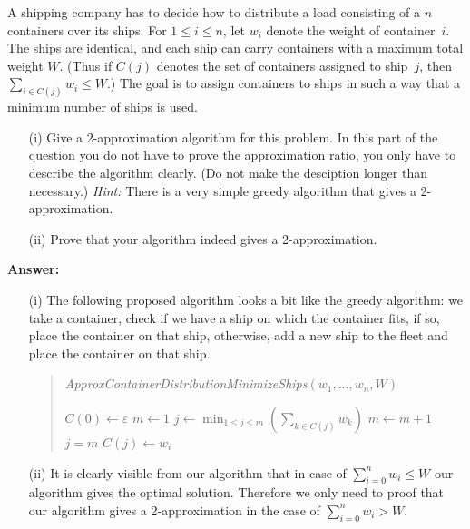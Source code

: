 \documentclass{article}
\newcommand{\eps}{\varepsilon}
\renewcommand{\leq}{\leqslant}
\renewcommand{\geq}{\geqslant}
\newcounter{rcounter}
\newenvironment{rlist}%
{\begin{list}{\setnr-\arabic{rcounter}}{\usecounter{rcounter}}}{\end{list}}
\begin{document}
\begin{rlist}
        A shipping company has to decide how to distribute a load consisting of a $n$ containers over its ships. For $1\leq i\leq n$, let $w_i$ denote the weight of container~$i$. The ships are identical, and each ship can carry containers with a maximum total weight $W$. (Thus if $C(j)$ denotes the set of containers assigned to ship~$j$, then $\sum_{i\in C(j)} w_i \leq W$.) The goal is to assign containers to ships in such a way that a minimum number of ships is used.
        \begin{enumerate}
            \item[(i)]
            Give a 2-approximation algorithm for this problem. In this part of the question you do not have to prove the approximation ratio, you only have to describe the algorithm clearly. (Do not make the desciption longer than necessary.)
            \emph{Hint:} There is a very simple greedy algorithm that gives a 2-approximation.
            \item[(ii)]
            Prove that your algorithm indeed gives a 2-approximation. 
        \end{enumerate}
        
        \textbf{Answer:}
        \begin{enumerate}
            \item[(i)]
            The following proposed algorithm looks a bit like the greedy algorithm: we take a container, check if we have a ship on which the container fits, if so, place the container on that ship, otherwise, add a new ship to the fleet and place the container on that ship.
            \begin{algorithm}
                \vspace*{2mm}
                \begin{quotation}
                    \noindent
                    \emph{ApproxContainerDistributionMinimizeShips}$(w_1,...,w_n,W)$ \\[-5mm]
                    \begin{algorithmic}[1]
                        \State $C(0) \leftarrow \eps$
                        \State $m \leftarrow 1$
                        \State $j \leftarrow \min_{1 \leq j \leq m} (\sum\nolimits_{k \in C(j)} w_k)$
                        \If{$(\sum\nolimits_{k \in C(m)} w_k) + w_i \geq W $}
                        \State $m \leftarrow m + 1$
                        \State $j = m$
                        \EndIf
                        \State $C(j) \leftarrow w_i$
                        \EndFor
                    \end{algorithmic}
                \end{quotation}
            \end{algorithm}
            \item[(ii)]
            It is clearly visible from our algorithm that in case of $\sum_{i = 0}^n w_i \leq W$ our algorithm gives the optimal solution. Therefore we only need to proof that our algorithm gives a 2-approximation in the case of $\sum_{i = 0}^n w_i > W$.
            

\end{enumerate}
\end{rlist}
\end{document}
